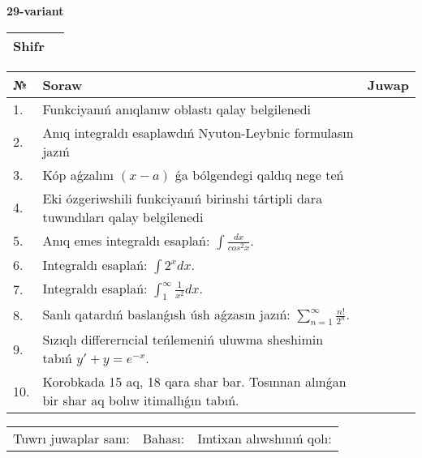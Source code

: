 \documentclass{article}
\begin{document}
  \egroup
  
  \newpage
  
  
  \textbf{29-variant}\\
  
  \bgroup
  \def\arraystretch{1.6} %
  
  \begin{tabular}{|m{5.7cm}|m{9.5cm}|}
  \hline
  Shifr & \\
  \hline
  \end{tabular}
  
  \vspace{1cm}
  
  \begin{tabular}{|m{0.7cm}|m{10cm}|m{4cm}|}
  \hline
  № & Soraw & Juwap \\
  \hline
  1. & Funkciyanıń anıqlanıw oblastı qalay belgilenedi &  \\
  \hline
  2. & Anıq integraldı esaplawdıń Nyuton-Leybnic formulasın jazıń &  \\
  \hline
  3. & Kóp aǵzalını \((x - a)\) ǵa bólgendegi qaldıq nege teń &  \\
  \hline
  4. & Eki ózgeriwshili funkciyanıń birinshi tártipli dara tuwındıları qalay belgilenedi &  \\
  \hline
  5. & Anıq emes integraldı esaplań: \(\int\frac{dx}{cos^2 x}\). &  \\
  \hline
  6. & Integraldı esaplań: \(\int{2^{x}dx}\). &  \\
  \hline
  7. & Integraldı esaplań: \(\int_{1}^{\infty}{\frac{1}{x^2 }dx}\). &  \\
  \hline
  8. & Sanlı qatardıń baslanǵısh úsh aǵzasın jazıń: \(\sum_{n = 1}^{\infty}\frac{n!}{2^{n}}\). &  \\
  \hline
  9. & Sızıqlı differerncial teńlemeniń uluwma sheshimin tabıń \(y' + y = e^{- x}\). &  \\
  \hline
  10. & Korobkada 15 aq, 18 qara shar bar. Tosınnan alınǵan bir shar aq bolıw itimallıǵın tabıń. &  \\
  \hline
  \end{tabular}
  
  \vspace{1cm}
  
  \begin{tabular}{lll}
  Tuwrı juwaplar sanı: \underline{\hspace{1.5cm}} & 
  Bahası: \underline{\hspace{1.5cm}} & 
  Imtixan alıwshınıń qolı: \underline{\hspace{2cm}} \\
  \end{tabular}
  
\end{document}
